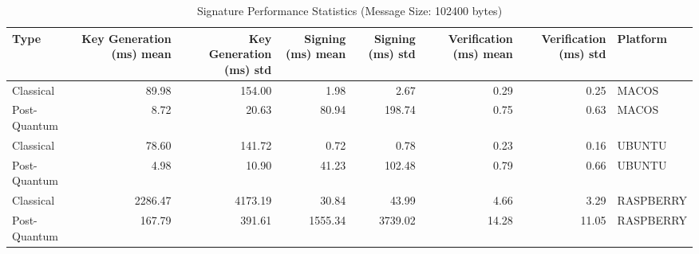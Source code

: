 \begin{table}
\caption{Signature Performance Statistics (Message Size: 102400 bytes)}
\label{tab:sig_platform_stats_102400}
\begin{tabular}{lrrrrrrl}
\toprule
Type & Key Generation (ms) mean & Key Generation (ms) std & Signing (ms) mean & Signing (ms) std & Verification (ms) mean & Verification (ms) std & Platform \\
\midrule
Classical & 89.98 & 154.00 & 1.98 & 2.67 & 0.29 & 0.25 & MACOS \\
Post-Quantum & 8.72 & 20.63 & 80.94 & 198.74 & 0.75 & 0.63 & MACOS \\
Classical & 78.60 & 141.72 & 0.72 & 0.78 & 0.23 & 0.16 & UBUNTU \\
Post-Quantum & 4.98 & 10.90 & 41.23 & 102.48 & 0.79 & 0.66 & UBUNTU \\
Classical & 2286.47 & 4173.19 & 30.84 & 43.99 & 4.66 & 3.29 & RASPBERRY \\
Post-Quantum & 167.79 & 391.61 & 1555.34 & 3739.02 & 14.28 & 11.05 & RASPBERRY \\
\bottomrule
\end{tabular}
\end{table}
